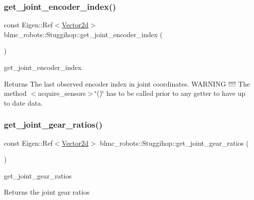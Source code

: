 \subsubsection{\texorpdfstring{get\+\_\+joint\+\_\+encoder\+\_\+index()}{get\_joint\_encoder\_index()}}
{\footnotesize\ttfamily const Eigen\+::\+Ref$<$\hyperlink{common__header_8hpp_acb6916bc8c9fe9d98c484fd4cc201447}{Vector2d}$>$ blmc\+\_\+robots\+::\+Stuggihop\+::get\+\_\+joint\+\_\+encoder\+\_\+index (\begin{DoxyParamCaption}{ }\end{DoxyParamCaption})\hspace{0.3cm}{\ttfamily [inline]}}



get\+\_\+joint\+\_\+encoder\+\_\+index 

\begin{DoxyReturn}{Returns}
The last observed encoder index in joint coordinates. W\+A\+R\+N\+I\+NG !!!! The method $<$acquire\+\_\+sensors$>$\char`\"{}()\char`\"{} has to be called prior to any getter to have up to date data. 
\end{DoxyReturn}
\mbox{\label{classblmc__robots_1_1Stuggihop_ae693c1a57f25426d82cece8d5066d331}} 
\subsubsection{\texorpdfstring{get\+\_\+joint\+\_\+gear\+\_\+ratios()}{get\_joint\_gear\_ratios()}}
{\footnotesize\ttfamily const Eigen\+::\+Ref$<$\hyperlink{common__header_8hpp_acb6916bc8c9fe9d98c484fd4cc201447}{Vector2d}$>$ blmc\+\_\+robots\+::\+Stuggihop\+::get\+\_\+joint\+\_\+gear\+\_\+ratios (\begin{DoxyParamCaption}{ }\end{DoxyParamCaption})\hspace{0.3cm}{\ttfamily [inline]}}



get\+\_\+joint\+\_\+gear\+\_\+ratios 

\begin{DoxyReturn}{Returns}
the joint gear ratios 
\end{DoxyReturn}
\mbox{\label{classblmc__robots_1_1Stuggihop_a776d704e7fd109da3095d4da03fcf12b}} 
